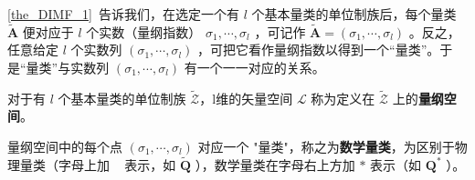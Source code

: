 
\begin{issues}
\issueTODO
\end{issues}

\autoref{the_DIMF_1}~告诉我们，在选定一个有 $l$ 个基本量类的单位制族后，每个量类 $\tilde{\boldsymbol{A}}$ 便对应于 $l$ 个实数（量纲指数） $\sigma_1,\cdots,\sigma_l$ ，可记作 $\tilde{\boldsymbol{A}}=(\sigma_1,\cdots,\sigma_l)$ 。反之，任意给定 $l$ 个实数列 $(\sigma_1,\cdots,\sigma_l)$ ，可把它看作量纲指数以得到一个“量类”。于是“量类”与实数列 $(\sigma_1,\cdots,\sigma_l)$ 有一个一一对应的关系。
\begin{definition}{}
对于有 $l$ 个基本量类的单位制族 $\tilde{\mathscr{Z}}$，l维的矢量空间 $\mathscr{L}$ 称为定义在 $\tilde{\mathscr{Z}}$ 上的\textbf{量纲空间}。
\end{definition}
量纲空间中的每个点 $(\sigma_1,\cdots,\sigma_l)$ 对应一个 "量类"，称之为\textbf{数学量类}，为区别于物理量类（字母上加 ~ 表示，如 $\tilde{\boldsymbol{Q}}$ ），数学量类在字母右上方加 $*$ 表示（如 $\boldsymbol{Q}^*$ ）。
